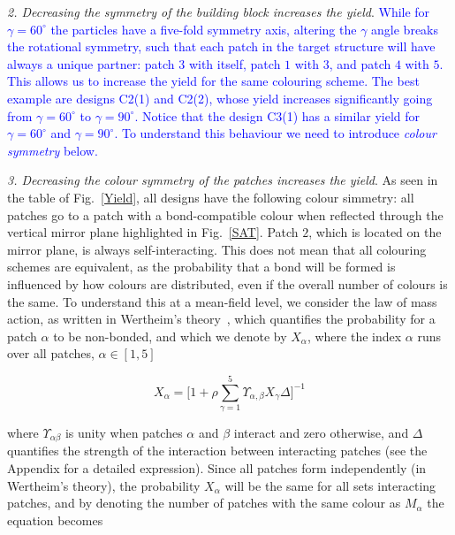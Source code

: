 \documentclass[a4paper, amsfonts, amssymb, amsmath, reprint, showkeys, nofootinbib, twoside]{revtex4-1}
\begin{document}
\noindent
\emph{2. Decreasing the symmetry of the building block increases the yield}. \textcolor{blue}{While for $\gamma=60^\circ$ the particles have a five-fold symmetry axis, altering the $\gamma$ angle breaks the rotational symmetry, such that each patch in the target structure will have always a unique partner: patch $3$ with itself, patch $1$ with $3$, and patch $4$ with $5$. This allows us to increase the yield for the same colouring scheme. The best example are designs C2(1) and C2(2), whose yield increases significantly going from $\gamma=60^\circ$ to $\gamma=90^\circ$. Notice that the design C3(1) has a similar yield for $\gamma=60^\circ$ and $\gamma=90^\circ$. To understand this behaviour we need to introduce \emph{colour symmetry} below.}


\noindent
\emph{3. Decreasing the colour symmetry of the patches increases the yield}. As seen in the table of Fig.~\ref{Yield}, all designs have the following colour simmetry: all patches go to a patch with a bond-compatible colour when reflected through the vertical mirror plane highlighted in Fig.~\ref{SAT}. Patch $2$, which is located on the mirror plane, is always self-interacting. This does not mean that all colouring schemes are equivalent, as the probability that a bond will be formed is influenced by how colours are distributed, even if the overall number of colours is the same. To understand this at a mean-field level, we consider the law of mass action, as written in Wertheim's theory~\textcolor{blue}{\cite{wertheim1984fluids,chapman1988phase,heras2011phase,teixeira2017phase}},
which quantifies the probability for a patch $\alpha$ to be non-bonded, and which we denote by $X_{\alpha}$, where the index $\alpha$ runs over all patches, $\alpha\in[1,5]$

\begin{equation}
\label{prob}
X_{\alpha}=\biggl[ 1+ \rho \sum_{\gamma=1}^5 \Upsilon_{\alpha,\beta} X_{\gamma} \Delta\biggr]^{-1}
\end{equation}

\noindent where $\Upsilon_{\alpha\beta}$ is unity when patches $\alpha$ and $\beta$ interact and zero otherwise, and $\Delta$ quantifies the strength of the interaction between interacting patches (see the Appendix for a detailed expression). Since all patches form independently (in Wertheim's theory), the probability $X_\alpha$ will be the same for all sets interacting patches, and by denoting the number of patches with the same colour as $M_\alpha$ the equation becomes
\end{document}
